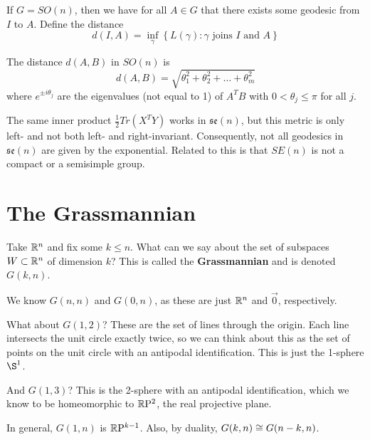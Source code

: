If $G=SO(n)$, then we have for all $A\in G$ that there exists some geodesic from $I$ to $A$.  Define the distance $$d(I,A)=\inf\limits_\gamma\left\{ L(\gamma) : \gamma \text{ joins } I\text{ and } A    \right\}$$

The distance $d(A,B)$ in $SO(n)$ is 
$$d(A,B) = \sqrt{\theta_1^2 + \theta_2^2 + \dots + \theta_m^2}$$ where $e^{\pm i \theta_j}$ are the eigenvalues (not equal to 1) of $A^TB$ with $0<\theta_j\leq \pi$ for all $j$.

The same inner product $\frac{1}{2}Tr(X^TY)$ works in $\mathfrak{se}(n)$, but this metric is only left- and not both left- and right-invariant.  Consequently, not all geodesics in $\mathfrak{se}(n)$ are given by the exponential.  Related to this is that $SE(n)$ is not a compact or a semisimple group.


\section*{The Grassmannian}

Take $\mathbb{R}^n$ and fix some $k\leq n$.  What can we say about the set of subspaces $W\subset \mathbb{R}^n$ of dimension $k$?  This is called the \textbf{Grassmannian} and is denoted $G(k,n)$.

We know $G(n,n)$ and $G(0,n)$, as these are just $\mathbb{R}^n$ and $\vec{0}$, respectively.

What about $G(1,2)$?  These are the set of lines through the origin.  Each line intersects the unit circle exactly twice, so we can think about this as the set of points on the unit circle with an antipodal identification.  This is just the 1-sphere $\S^1$.

And $G(1,3)$? This is the 2-sphere with an antipodal identification, which we know to be homeomorphic to $\mathbb{R}\mathrm{P}^2$, the real projective plane. 

 In general, $G(1,n)$ is $\mathbb{R}\mathrm{P}^{k-1}$.  Also, by duality, $G(k,n)\cong G(n-k,n)$.



